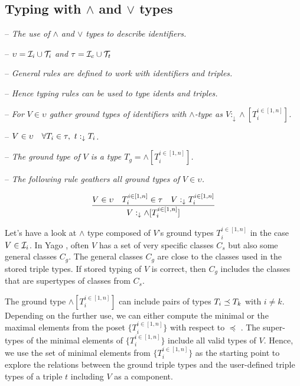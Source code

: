 \documentclass[runningheads]{llncs}
\newcommand{\darr}{\downarrow}
\newcommand{\I}{{\cal I}}
\newcommand{\T}{{\cal T}}
\newcommand{\memo}[1]{}
\newcommand{\notes}[1]{\noindent\begin{small}-- \emph{#1}\hfill\break\end{small}}
\newcommand{\nnotes}[1]{\indent\begin{small}-- \emph{#1}\hfill\break\end{small}}
\newcommand{\ennotes}[1]{\indent\begin{small}-- \emph{#1}\hfill\end{small}}
\begin{document}
\subsection{Typing with $\land$ and $\lor$ types}

\medskip
\notes{The use of $\land$ and $\lor$ types to describe identifiers.}
\nnotes{$\upsilon=\I_i\cup\T_i$ and $\tau=\I_c\cup\T_t$}
\nnotes{General rules are defined to work with identifiers and triples.}
\nnotes{Hence typing rules can be used to type idents and triples.}

\notes{For $V\in\upsilon$ gather ground types of identifiers with $\land$-type as $V:_{\darr}\land[T_i^{i\in[1,n]}]$.}
\nnotes{$V\in\upsilon\quad\forall\/T_i\in\tau,\ t:_{\darr}T_i$.}
\nnotes{The ground type of $V$ is a type $T_g=\land[T_i^{i\in[1,n]}]$.}
\ennotes{The following rule geathers all ground types of $V\in\upsilon$.}

\begin{equation}
\label{rul:land-1}
\dfrac{V\in\upsilon\quad\/T_i^{i\in[1,n]}\in\tau\quad\/V:_{\darr}T_i^{i\in[1,n]}}
      {V:_{\darr}\land[T_i^{i\in[1,n]}]}
\end{equation}

Let's have a look at $\land$ type composed of $V$'s ground types
$T_i^{i\in[1,n]}$ in the case $V\in\I_i$. In Yago \cite{Hoffart2013},
often $V$ has a set of very specific classes $C_s$ but also some
general classes $C_g$. The general classes $C_g$ are close to the
classes used in the stored triple types. If stored typing of $V$ is
correct, then $C_g$ includes the classes that are supertypes of
classes from $C_s$.

The ground type $\land[T_i^{i\in[1,n]}]$ can include pairs of types
$T_i\preceq\/T_k$ with $i\not=k$. Depending on the further use, we can
either compute the minimal or the maximal elements from the poset
$\{T_i^{i\in[1,n]}\}$ with respect to $\preceq$
\cite{DaveyPriestley2002}. The super-types of the minimal elements of
$\{T_i^{i\in[1,n]}\}$ include all valid types of $V$. Hence, we use
the set of minimal elements from $\{T_i^{i\in[1,n]}\}$ as the starting
point to explore the relations between the ground triple types and the
user-defined triple types of a triple $t$ including $V$ as a
component.

\memo{the type $\land[T_i^{i\in[1,n]}]$ It makes sense
either to compute MIN or MAX of $\land[T_i^{i\in[1,n]}]$ yielding
$\land[S_1..S_m]$ where $m\le\/n$ and
$S_j^{j\in[1,m]}\in\{T_i^{i\in[1,n]}\}$. The operator MIN computes
$S_j^{j\in[1,m]}$ such that each $S_j$ is minimal among
$T_i^{i\in[1,n]}$. The operator MAX computes $S_j^{j\in[1,m]}$ such
that each $S_j$ is maximal among $T_i^{i\in[1,n]}$. Note that in both
cases there are no pairs among $S_j^{j\in[1,m]}$ related by $\preceq$.}
\end{document}
